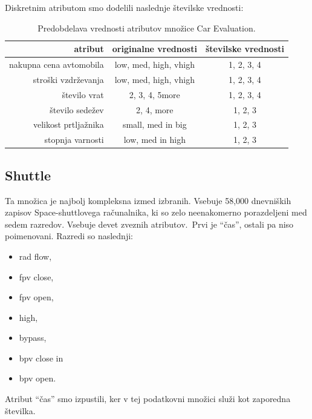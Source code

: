 \documentclass[a4paper,12pt,openright]{book}
\begin{document}
    Diskretnim atributom smo dodelili naslednje številske vrednosti:
    \begin{table}[H]
        \centering
        \begin{tabular}{||r c c||}
            \hline
            atribut                 & originalne vrednosti   & številske vrednosti \\ \hline
            nakupna cena avtomobila & low, med, high, vhigh & 1, 2, 3, 4          \\ \hline
            stroški vzdrževanja     & low, med, high, vhigh & 1, 2, 3, 4          \\ \hline
            število vrat            & 2, 3, 4, 5more        & 1, 2, 3, 4          \\ \hline
            število sedežev         & 2, 4, more            & 1, 2, 3             \\ \hline
            velikost prtljažnika    & small, med in big     & 1, 2, 3             \\ \hline
            stopnja varnosti        & low, med in high      & 1, 2, 3             \\ \hline
        \end{tabular}
        \caption{Predobdelava vrednosti atributov množice Car Evaluation.}
        \label{tab:car_predobdelava}
    \end{table}

    \subsection{Shuttle}\label{subsec:statlog-shuttle}
    Ta množica je najbolj kompleksna izmed izbranih.
    Vsebuje 58,000 dnev\-ni\-ških zapisov Space-shuttlovega računalnika, ki so zelo neenakomerno porazdeljeni med sedem razredov.
    Vsebuje devet zveznih atributov.\ Prvi je \enquote{čas}, ostali pa niso poimenovani.
    Razredi so naslednji:
    \begin{itemize}
        \item rad flow,
        \item fpv close,
        \item fpv open,
        \item high,
        \item bypass,
        \item bpv close in
        \item bpv open.
    \end{itemize}

    Atribut \enquote{čas} smo izpustili, ker v tej podatkovni množici služi kot zaporedna številka.
\end{document}
